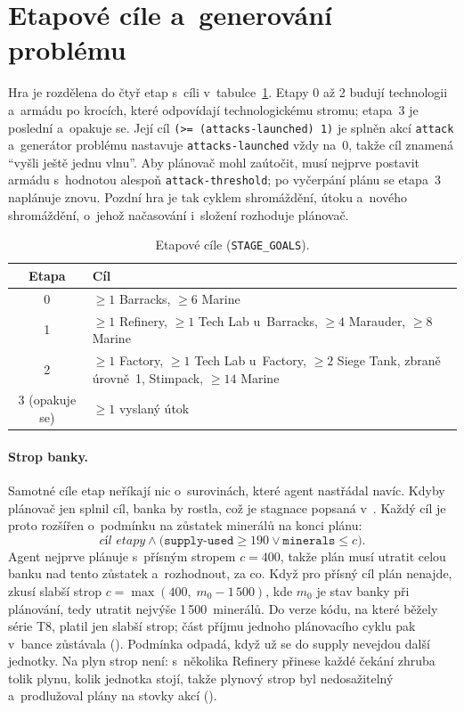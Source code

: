 \section{Etapové cíle a~generování problému}
\label{sec:etapy}

Hra je rozdělena do čtyř etap s~cíli v~tabulce~\ref{tab:etapy}. Etapy 0 až 2 budují technologii a~armádu po krocích, které odpovídají technologickému stromu; etapa~3 je poslední a~opakuje se. Její cíl \texttt{(>= (attacks-launched) 1)} je splněn akcí \texttt{attack} a~generátor problému nastavuje \texttt{attacks-launched} vždy na~0, takže cíl znamená \enquote{vyšli ještě jednu vlnu}. Aby plánovač mohl zaútočit, musí nejprve postavit armádu s~hodnotou alespoň \texttt{attack-threshold}; po vyčerpání plánu se etapa~3 naplánuje znovu. Pozdní hra je tak cyklem shromáždění, útoku a~nového shromáždění, o~jehož načasování i~složení rozhoduje plánovač.

\begin{table}[ht]
	\centering
	\caption{Etapové cíle (\texttt{STAGE\_GOALS}).}
	\label{tab:etapy}
	\begin{tabularx}{\textwidth}{@{} c >{\raggedright\arraybackslash}X @{}}
		\toprule
		\textbf{Etapa} & \textbf{Cíl} \\
		\midrule
		0 & $\ge 1$ Barracks, $\ge 6$ Marine \\
		1 & $\ge 1$ Refinery, $\ge 1$ Tech Lab u~Barracks, $\ge 4$ Marauder, $\ge 8$ Marine \\
		2 & $\ge 1$ Factory, $\ge 1$ Tech Lab u~Factory, $\ge 2$ Siege Tank, zbraně úrovně~1, Stimpack, $\ge 14$ Marine \\
		3 (opakuje se) & $\ge 1$ vyslaný útok \\
		\bottomrule
	\end{tabularx}
\end{table}

\paragraph{Strop banky.} Samotné cíle etap neříkají nic o~surovinách, které agent nastřádal navíc. Kdyby plánovač jen splnil cíl, banka by rostla, což je stagnace popsaná v~\cite{Orava2025}. Každý cíl je proto rozšířen o~podmínku na zůstatek minerálů na konci plánu:
\[
	\textit{cíl etapy} \wedge \big(\texttt{supply-used} \ge 190 \vee \texttt{minerals} \le c\big).
\]
Agent nejprve plánuje s~přísným stropem $c = 400$, takže plán musí utratit celou banku nad tento zůstatek a~rozhodnout, za co. Když pro přísný cíl plán nenajde, zkusí slabší strop $c = \max(400,\; m_0 - 1\,500)$, kde $m_0$ je stav banky při plánování, tedy utratit nejvýše 1\,500~minerálů. Do verze kódu, na které běžely série T8, platil jen slabší strop; část příjmu jednoho plánovacího cyklu pak v~bance zůstávala (). Podmínka odpadá, když už se do supply nevejdou další jednotky. Na plyn strop není: s~několika Refinery přinese každé čekání zhruba tolik plynu, kolik jednotka stojí, takže plynový strop byl nedosažitelný a~prodlužoval plány na stovky akcí ().

